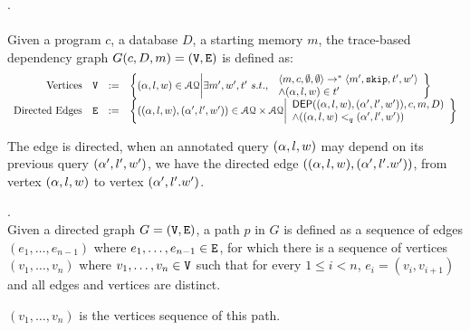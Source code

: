 \documentclass[a4paper,11pt]{article}
\begin{document}
\begin{defn}.
\label{def:trace-based_graph}
\\
\\
Given a program $c$, a database $D$, a starting memory $m$, the trace-based dependency graph $G(c,D,m) = (\mathtt{V}, \mathtt{E})$ is defined as: 
%
\[
\begin{array}{rlcl}
	\text{Vertices} &
	\vertxs & := & \left\{ 
	({\qval}, l,w) \in \mathcal{AQ} \middle\vert
	\exists m',  w', t' ~ s.t., ~  
	\begin{array}{l}
	\config{m ,c, \emptyset, \emptyset}  
	\to^{*}  
	\config{m' , \eskip, t', w' } \\ 
	\land ({\qval}, l, w) \in t'
	\end{array}
	\right\}
	\\
	\text{Directed Edges} &
	\edges & := & 
	\left\{ 
	(({\qval},l,w),({\qval}',l',w')) \in \mathcal{AQ} \times \mathcal{AQ} 
	\middle\vert
	\begin{array}{l}
		\mathsf{DEP}(({\qval},l,w), ({\qval}',l',w')),c,m,D) \\
		\land 
		(({\qval},l,w) <_q ({\qval}',l',w'))
	\end{array}
	\right\}
\end{array}
\]
\end{defn}
The edge is directed, when an annotated query $({\alpha},l,w)$ may depend on its previous query $({\alpha}',l',w')$, we have the directed
edge $(({\alpha},l,w), ({\alpha}',l'.w'))$, 
from vertex $(\alpha,l,w) $ to vertex $({\alpha}',l'.w')$.
%
%
\begin{defn}[Path ($p$)].
\\
Given a directed graph $G = (\mathtt{V}, \mathtt{E})$, a path $p$ in $G$ is defined as a sequence of edges $(e_1, \ldots, e_{n - 1})$ where $ e_1, \ldots, e_{n - 1} \in \mathtt{E}$,
for which there is a sequence of vertices $(v_1, \ldots, v_n)$ where $v_1, \ldots, v_n \in \mathtt{V}$
such that for every $1 \leq i < n$, $e_i=(v_{i},v_{i + 1})$
and all edges and vertices are distinct. 

$(v_1, \ldots, v_n)$ is the vertices sequence of this path.

\end{defn}
%
\end{document}
